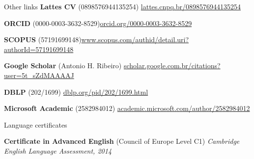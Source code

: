 \documentclass{resume} %
\begin{document}
\begin{rSection}{Other links}
{\bf Lattes CV} {(0898576944135254)} \hfill\href{http://lattes.cnpq.br/0898576944135254}{lattes.cnpq.br/0898576944135254}

{\bf ORCID} {(0000-0003-3632-8529)}\hfill {\href{https://orcid.org/0000-0003-3632-8529}{orcid.org/0000-0003-3632-8529}}

{\bf SCOPUS} {(57191699148)}\hfill{\href{https://www.scopus.com/authid/detail.uri?authorId=57191699148}{www.scopus.com/authid/detail.uri?authorId=57191699148}}

{\bf Google Scholar} {(Antonio H. Ribeiro)}\hfill
{\href{https://scholar.google.com.br/citations?user=5t_sZdMAAAAJ}{scholar.google.com.br/citations?user=5t\_sZdMAAAAJ}}

{\bf DBLP} {(202/1699)}\hfill{
\href{https://dblp.org/pid/202/1699.html}{dblp.org/pid/202/1699.html}}

{\bf Microsoft Academic} {(2582984012)}\hfill{
\href{https://academic.microsoft.com/author/2582984012}{academic.microsoft.com/author/2582984012}}


\end{rSection}





\begin{rSection}{Language certificates}


{\bf Certificate in Advanced English} (Council of Europe Level C1) \hfill {\em Cambridge English Language Assessment, 2014}


\end{rSection}
\end{document}
